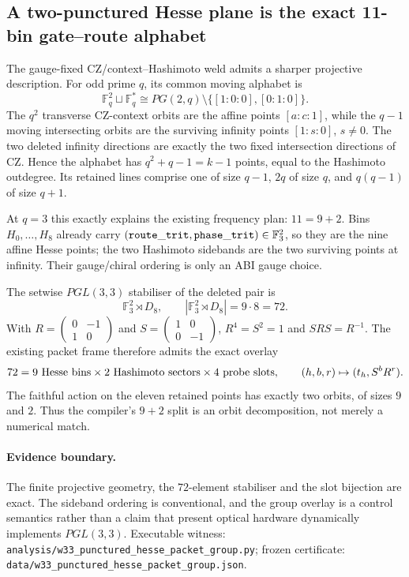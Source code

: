 \subsection{A two-punctured Hesse plane is the exact 11-bin gate--route alphabet}
\label{sec:20260919-punctured-hesse-packet-group}

The gauge-fixed CZ/context--Hashimoto weld admits a sharper projective description.
For odd prime $q$, its common moving alphabet is
\[
\mathbb F_q^2\sqcup\mathbb F_q^*\cong PG(2,q)\setminus\{[1{:}0{:}0],[0{:}1{:}0]\}.
\]
The $q^2$ transverse CZ-context orbits are the affine points $[a{:}c{:}1]$, while the
$q-1$ moving intersecting orbits are the surviving infinity points $[1{:}s{:}0]$, $s\ne0$.
The two deleted infinity directions are exactly the two fixed intersection directions of CZ.
Hence the alphabet has $q^2+q-1=k-1$ points, equal to the Hashimoto outdegree.
Its retained lines comprise one of size $q-1$, $2q$ of size $q$, and $q(q-1)$ of size $q+1$.

At $q=3$ this exactly explains the existing frequency plan: $11=9+2$.
Bins $H_0,\ldots,H_8$ already carry $({\tt route\_trit},{\tt phase\_trit})\in\mathbb F_3^2$,
so they are the nine affine Hesse points; the two Hashimoto sidebands are the two surviving
points at infinity. Their gauge/chiral ordering is only an ABI gauge choice.

The setwise $PGL(3,3)$ stabiliser of the deleted pair is
\[\mathbb F_3^2\rtimes D_8,\qquad |\mathbb F_3^2\rtimes D_8|=9\cdot8=72.\]
With $R=\left(\begin{smallmatrix}0&-1\\1&0\end{smallmatrix}\right)$ and
$S=\left(\begin{smallmatrix}1&0\\0&-1\end{smallmatrix}\right)$,
$R^4=S^2=1$ and $SRS=R^{-1}$.  The existing packet frame therefore admits the exact overlay
\[
72=9\ {\rm Hesse\ bins}\times2\ {\rm Hashimoto\ sectors}\times4\ {\rm probe\ slots},
\qquad (h,b,r)\mapsto(t_h,S^bR^r).
\]
The faithful action on the eleven retained points has exactly two orbits, of sizes $9$ and $2$.
Thus the compiler's $9+2$ split is an orbit decomposition, not merely a numerical match.

\paragraph{Evidence boundary.}
The finite projective geometry, the $72$-element stabiliser and the slot bijection are exact.
The sideband ordering is conventional, and the group overlay is a control semantics rather than
a claim that present optical hardware dynamically implements $PGL(3,3)$.
Executable witness: \texttt{analysis/w33\_punctured\_hesse\_packet\_group.py};
frozen certificate: \texttt{data/w33\_punctured\_hesse\_packet\_group.json}.
